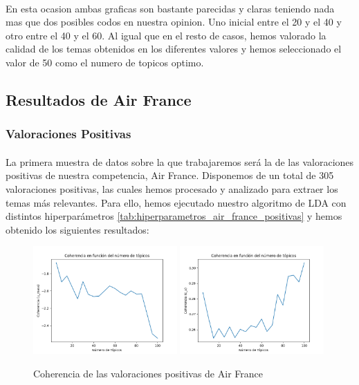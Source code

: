 \documentclass{report}
\begin{document}
{                    \paragraph*{}{
                        En esta ocasion ambas graficas son bastante parecidas y claras teniendo nada mas que dos posibles codos en nuestra opinion.
                        Uno inicial entre el 20 y el 40 y otro entre el 40 y el 60.
                        Al igual que en el resto de casos, hemos valorado la calidad de los temas obtenidos en los diferentes valores y hemos seleccionado el valor de 50 como el numero de topicos optimo.
                    }
            \clearpage\subsection{Resultados de Air France}
                \subsubsection*{Valoraciones Positivas}
                    \paragraph*{}{
                        La primera muestra de datos sobre la que trabajaremos será la de las valoraciones positivas de nuestra competencia, Air France.
                        Disponemos de un total de 305 valoraciones positivas, las cuales hemos procesado y analizado para extraer los temas más relevantes.
                        Para ello, hemos ejecutado nuestro algoritmo de LDA con distintos hiperparámetros \ref{tab:hiperparametros_air_france_positivas} y hemos obtenido los siguientes resultados:
                    }
                    \begin{figure}[H]
                        \centering
                        \includegraphics[width=0.49\textwidth]{./img/air_france_positivas_umass.png}
                        \includegraphics[width=0.49\textwidth]{./img/air_france_positivas_cv.png}
                        \caption{Coherencia de las valoraciones positivas de Air France}
                    \end{figure}
}
\end{document}
